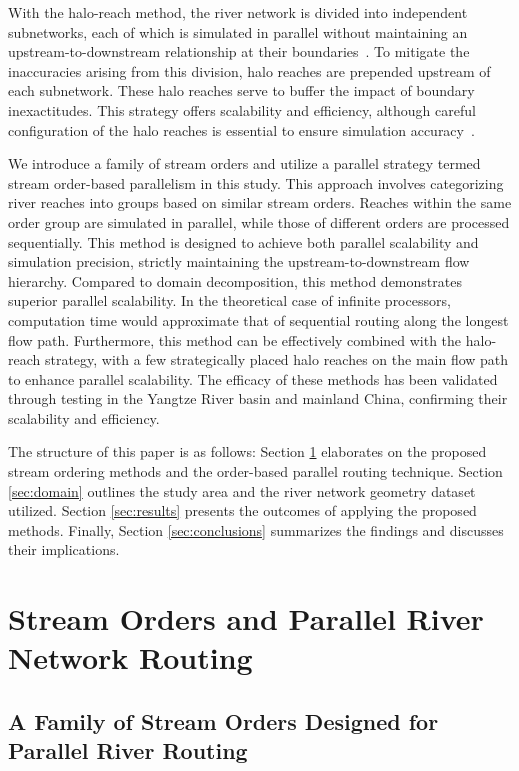 \documentclass[water,article,submit,pdftex,moreauthors]{Definitions/mdpi}
\begin{document}
With the halo-reach method, the river network is divided into independent subnetworks, each of which is simulated in parallel without maintaining an upstream-to-downstream relationship at their boundaries~\cite{david2015WRR}. To mitigate the inaccuracies arising from this division, halo reaches are prepended upstream of each subnetwork. These halo reaches serve to buffer the impact of boundary inexactitudes. This strategy offers scalability and efficiency, although careful configuration of the halo reaches is essential to ensure simulation accuracy~\cite{david2013WRR}.

We introduce a family of stream orders and utilize a parallel strategy termed stream order-based parallelism in this study. This approach involves categorizing river reaches into groups based on similar stream orders. Reaches within the same order group are simulated in parallel, while those of different orders are processed sequentially. This method is designed to achieve both parallel scalability and simulation precision, strictly maintaining the upstream-to-downstream flow hierarchy. Compared to domain decomposition, this method demonstrates superior parallel scalability. In the theoretical case of infinite processors, computation time would approximate that of sequential routing along the longest flow path. Furthermore, this method can be effectively combined with the halo-reach strategy, with a few strategically placed halo reaches on the main flow path to enhance parallel scalability. The efficacy of these methods has been validated through testing in the Yangtze River basin and mainland China, confirming their scalability and efficiency.

The structure of this paper is as follows: Section \ref{sec:methods} elaborates on the proposed stream ordering methods and the order-based parallel routing technique. Section \ref{sec:domain} outlines the study area and the river network geometry dataset utilized. Section \ref{sec:results} presents the outcomes of applying the proposed methods. Finally, Section \ref{sec:conclusions} summarizes the findings and discusses their implications.

\section{Stream Orders and Parallel River Network Routing}
\label{sec:methods}

\subsection{A Family of Stream Orders Designed for Parallel River Routing}
\label{sec:stream_order}
\end{document}

